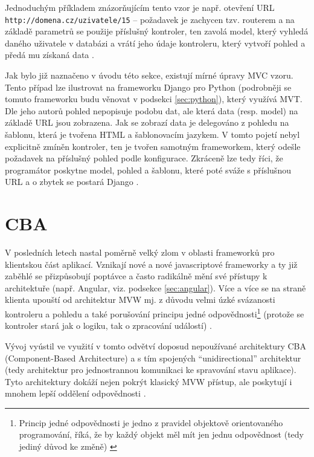     Jednoduchým příkladem znázorňujícím tento vzor je např. otevření URL \verb|http://domena.cz/uzivatele/15| -- požadavek je zachycen tzv. routerem a na základě parametrů se použije příslušný kontroler, ten zavolá model, který vyhledá daného uživatele v databázi a vrátí jeho údaje kontroleru, který vytvoří pohled a předá mu získaná data \cite{mvc-cz1}.
    
    Jak bylo již naznačeno v úvodu této sekce, existují mírné úpravy MVC vzoru. Tento případ lze ilustrovat na frameworku Django pro Python (podrobněji se tomuto frameworku budu věnovat v podsekci \ref{sec:python}), který využívá MVT. Dle jeho autorů \cite{django-docs-mvp} pohled nepopisuje podobu dat, ale která data (resp. model) na základě URL jsou zobrazena. Jak se zobrazí data je delegováno z pohledu na šablonu, která je tvořena HTML a šablonovacím jazykem. V tomto pojetí nebyl explicitně zmíněn kontroler, ten je tvořen samotným frameworkem, který odešle požadavek na příslušný pohled podle konfigurace. Zkráceně lze tedy říci, že programátor poskytne model, pohled a šablonu, které poté sváže s příslušnou URL a o zbytek se postará Django \cite{django-mvp2}.
    
    \section{CBA}\label{cba}
    V posledních letech nastal poměrně velký zlom v oblasti frameworků pro klientskou část aplikací. Vznikají nové a nové javascriptové frameworky a ty již zaběhlé se přizpůsobují poptávce a často radikálně mění své přístupy k architektuře (např. Angular, viz. podsekce \ref{sec:angular}). Více a více se na straně klienta upouští od architektur MVW mj. z důvodu velmi úzké svázanosti kontroleru a pohledu a také porušování principu jedné odpovědnosti\footnote{Princip jedné odpovědnosti je jedno z pravidel objektově orientovaného programování, říká, že by každý objekt měl mít jen jednu odpovědnost (tedy jediný důvod ke změně) \cite{single-responsibility}} (protože se kontroler stará jak o logiku, tak o zpracování událostí) \cite{mvc-frontend}.
    
    Vývoj vyústil ve využití v tomto odvětví doposud nepoužívané architektury CBA (Component-Based Architecture) a s tím spojených  \enquote{unidirectional} architektur (tedy architektur pro jednostrannou komunikaci ke spravování stavu aplikace). Tyto architektury dokáží nejen pokrýt klasický MVW přístup, ale poskytují i mnohem lepší oddělení odpovědnosti \cite{mvc-frontend}.
    
